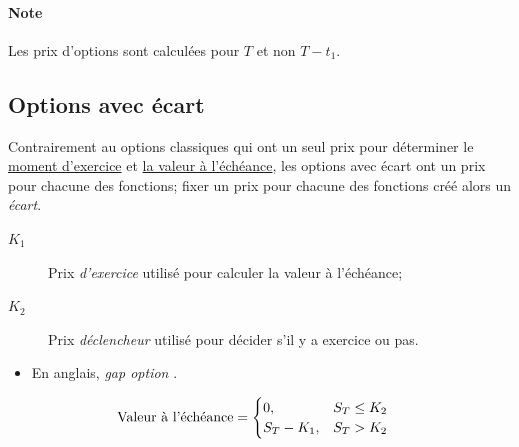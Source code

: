 \documentclass[10pt, french]{article}
\begin{document}
\begin{multicols*}{2}
\paragraph{Note}	Les prix d'options sont calculées pour $T$ et non $T	-	t_{1}$.

\columnbreak
\subsection{Options avec écart}
\begin{definitionNOHFILL}
Contrairement au options classiques qui ont un seul prix pour déterminer le \underline{moment d'exercice} et \underline{la valeur à l'échéance}, les options avec écart ont un prix pour chacune des fonctions; fixer un prix pour chacune des fonctions créé alors un \textit{écart}.

\begin{distributions}[Notation]
\begin{description}
	\item[$K_{1}$]	Prix \textit{d'exercice} utilisé pour calculer la valeur à l'échéance;
	\item[$K_{2}$]	Prix \textit{déclencheur} utilisé pour décider s'il y a exercice ou pas.
\end{description}
\end{distributions}

\tcbline

\begin{itemize}[leftmargin = *]
	\item	En anglais, \og \textit{gap option} \fg{}.
\end{itemize}
\end{definitionNOHFILL}

\begin{definitionNOHFILLsub}
\begin{align*}
	\shortstack{Valeur à l'échéance}
	&=	\begin{cases}
		0,	&	S_{T}	\leq		K_{2}	\\
		S_{T}	-	K_{1},	&	S_{T}	>		K_{2}	\\
		\end{cases}
\end{align*}

\begin{center}	

\begin{tikzpicture}[x=0.75pt,y=0.75pt,yscale=-1,xscale=1]


\end{tikzpicture}
\end{center}
\end{definitionNOHFILLsub}
\end{multicols*}
\end{document}
